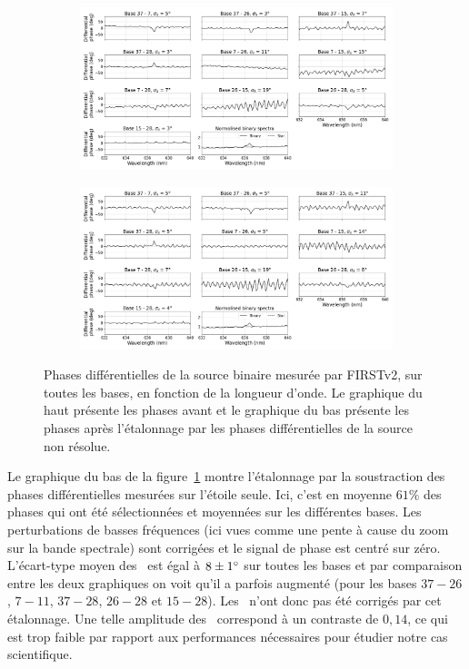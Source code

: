 \begin{figure}[ht!]
    \centering
    \begin{subfigure}{0.8\textwidth}
        \centering
        \includegraphics[width=\textwidth]{Figure_Chap4/20221010_Bin01_SpeDiffPhase_Raw_BaseSubplot_Pola1_LaTex.png}
    \end{subfigure}
    \begin{subfigure}{0.8\textwidth}
        \centering
        \includegraphics[width=\textwidth]{Figure_Chap4/20221010_Bin01_SpeDiffPhase_Calp2vm_BaseSubplot_Pola1_LaTex.png}
    \end{subfigure}
    \caption[Phases différentielles de la source binaire mesurée par FIRSTv2.]{Phases différentielles de la source binaire mesurée par FIRSTv2, sur toutes les bases, en fonction de la longueur d'onde. Le graphique du haut présente les phases avant et le graphique du bas présente les phases après l'étalonnage par les phases différentielles de la source non résolue.}
    \label{fig:PhaseDiffBinary}
\end{figure}

Le graphique du bas de la figure~\ref{fig:PhaseDiffBinary} montre l'étalonnage par la soustraction des phases différentielles mesurées sur l'étoile seule. Ici, c'est en moyenne $61\%$ des phases qui ont été sélectionnées et moyennées sur les différentes bases. Les perturbations de basses fréquences (ici vues comme une pente à cause du zoom sur la bande spectrale) sont corrigées et le signal de phase est centré sur zéro. L'écart-type moyen des \wiggles~est égal à $8 \pm 1^{\circ}$ sur toutes les bases et par comparaison entre les deux graphiques on voit qu'il a parfois augmenté (pour les bases $37-26$, $7-11$, $37-28$, $26-28$ et $15-28$). Les \wiggles~n'ont donc pas été corrigés par cet étalonnage. Une telle amplitude des \wiggles~correspond à un contraste de $0,14$, ce qui est trop faible par rapport aux performances nécessaires pour étudier notre cas scientifique.

